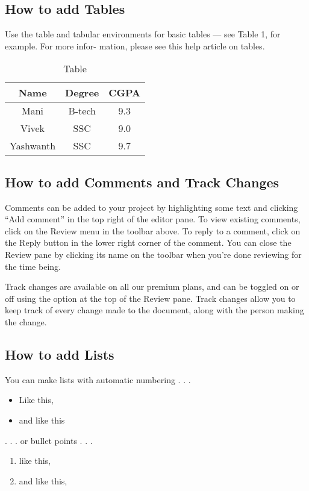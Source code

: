 \documentclass{article}
\begin{document}
  \subsection{How to add Tables }
 Use the table and tabular environments for basic tables — see Table 1, for example. For more infor-
 mation, please see this help article on tables.
 
 
 \begin{table}
 	\centering 
 	\begin{tabular}{|c|c|c|}
 		\hline
 		Name & Degree & CGPA\\
 		\hline
 		Mani & B-tech & 9.3\\
 		Vivek & SSC & 9.0\\
 		Yashwanth & SSC & 9.7\\
 		\hline
 	\end{tabular}
 	\caption{Table}
 	\label{fig:tab}
 \end{table}



 \subsection{How to add Comments and Track Changes}
 Comments can be added to your project by highlighting some text and clicking “Add comment” in
 the top right of the editor pane. To view existing comments, click on the Review menu in the toolbar
 above. To reply to a comment, click on the Reply button in the lower right corner of the comment.
 You can close the Review pane by clicking its name on the toolbar when you’re done reviewing for the
 time being.
 
 Track changes are available on all our premium plans, and can be toggled on or off using the option
 at the top of the Review pane. Track changes allow you to keep track of every change made to the
 document, along with the person making the change.
 
 
 \subsection{How to add Lists}
 You can make lists with automatic numbering . . .
\begin{itemize}
   \item Like this,
   \item and like this
\end{itemize}
  . . . or bullet points . . .
  \begin{enumerate}
 
     \item like this,
     \item and like this,
    \end{enumerate}
\end{document}
